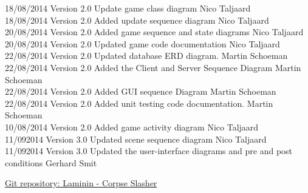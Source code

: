 \documentclass[letterpaper]{article}
\begin{document}
\begin{tabbing}
			18/08/2014  \> Version 2.0  \> Update game class diagram					\> Nico Taljaard\\
			18/08/2014  \> Version 2.0  \> Added update sequence diagram				\> Nico Taljaard\\
			20/08/2014  \> Version 2.0  \> Added game sequence and state diagrams		\> Nico Taljaard\\
			20/08/2014  \> Version 2.0  \> Updated game code documentation				\> Nico Taljaard\\
			22/08/2014  \> Version 2.0  \> Updated database ERD diagram.				\> Martin Schoeman\\
			22/08/2014  \> Version 2.0  \> Added the Client and Server Sequence Diagram	\> Martin Schoeman\\
			22/08/2014  \> Version 2.0  \> Added GUI sequence Diagram					\> Martin Schoeman\\
			22/08/2014  \> Version 2.0  \> Added unit testing code documentation.		\> Martin Schoeman\\
			10/08/2014	\> Version 2.0	\> Added game activity diagram					\> Nico Taljaard\\
			11/092014	\> Version 3.0	\> Updated scene sequence diagram				\> Nico Taljaard\\
			11/092014	\> Version 3.0	\> Updated the user-interface diagrams and pre and post conditions			\> Gerhard Smit\\
		\end{tabbing}
		
	\newpage
		\renewcommand\contentsname{TABLE OF CONTENTS}
		\newcommand\contentsnameLC{\colorbox{blue}{\makebox[\textwidth-2\fboxsep][l]{\bfseries\color{white} Table of Contents}}}
		
		\renewcommand{\cftdot}{}
		\hypersetup{linktocpage}
		\tableofcontents
		
		\begin{flushleft}
			\LARGE\href{https://github.com/njTaljaard/Laminin_CorpseSlasher/}{Git repository: Laminin - Corpse Slasher}
		\end{flushleft}
		
	\newpage
		
		\section*{\colorbox{blue}{}} 
		\vspace{0.1in}
			
\end{document}
